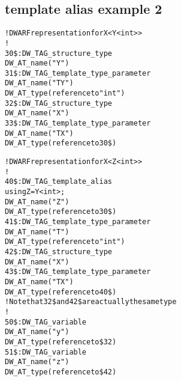 \subsection{template alias example 2}
\label{app:templatealiasexample2}
\begin{alltt}
! DWARF representation for X<Y<int>>
!
30\$: DW\_TAG\_structure\_type
        DW\_AT\_name("Y")
31\$:   DW\_TAG\_template\_type\_parameter
            DW\_AT\_name("TY")
            DW\_AT\_type(reference to "int")
32\$: DW\_TAG\_structure\_type
        DW\_AT\_name("X")
33\$:   DW\_TAG\_template\_type\_parameter
            DW\_AT\_name("TX")
            DW\_AT\_type(reference to 30\$)

! DWARF representation for X<Z<int>>
!
40\$: DW\_TAG\_template\_alias
using Z = Y<int>;
        DW\_AT\_name("Z")
        DW\_AT\_type(reference to 30\$)
41\$:   DW\_TAG\_template\_type\_parameter
            DW\_AT\_name("T")
            DW\_AT\_type(reference to "int")
42\$: DW\_TAG\_structure\_type
        DW\_AT\_name("X")
43\$:   DW\_TAG\_template\_type\_parameter
            DW\_AT\_name("TX")
            DW\_AT\_type(reference to 40\$)
! Note that 32\$ and 42\$ are actually the same type
!
50\$: DW\_TAG\_variable
        DW\_AT\_name("y")
        DW\_AT\_type(reference to \$32)
51\$: DW\_TAG\_variable
        DW\_AT\_name("z")
        DW\_AT\_type(reference to \$42)
\end{alltt}
